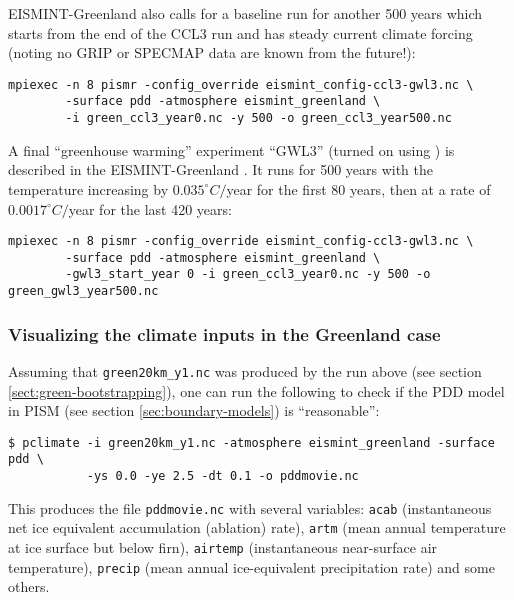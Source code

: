 EISMINT-Greenland also calls for a baseline run for another 500 years which starts from the end of the CCL3 run and has steady current climate forcing (noting no GRIP or SPECMAP data are known from the future!):

\begin{verbatim}
mpiexec -n 8 pismr -config_override eismint_config-ccl3-gwl3.nc \
        -surface pdd -atmosphere eismint_greenland \
        -i green_ccl3_year0.nc -y 500 -o green_ccl3_year500.nc
\end{verbatim}

A final ``greenhouse warming'' experiment ``GWL3'' (turned on using ) is described in the EISMINT-Greenland \cite{RitzEISMINT}.  It runs for 500 years with the temperature increasing by $0.035^\circ C/$year for the first 80 years, then at a rate of $0.0017^\circ C/$year for the last 420 years:

\begin{verbatim}
mpiexec -n 8 pismr -config_override eismint_config-ccl3-gwl3.nc \
        -surface pdd -atmosphere eismint_greenland \
        -gwl3_start_year 0 -i green_ccl3_year0.nc -y 500 -o green_gwl3_year500.nc
\end{verbatim}

\subsubsection*{Visualizing the climate inputs in the Greenland case}
\label{sec:pdd-series-with-pclimate}

Assuming that \texttt{green20km_y1.nc} was produced by the run above (see section
\ref{sect:green-bootstrapping}), one can run the following to check if the PDD
model in PISM (see section \ref{sec:boundary-models}) is ``reasonable'':
\begin{verbatim}
$ pclimate -i green20km_y1.nc -atmosphere eismint_greenland -surface pdd \
           -ys 0.0 -ye 2.5 -dt 0.1 -o pddmovie.nc 
\end{verbatim}%
This produces the file \texttt{pddmovie.nc} with several variables: \texttt{acab}
(instantaneous net ice equivalent accumulation (ablation) rate), \texttt{artm}
(mean annual temperature at ice surface but below firn), \texttt{airtemp}
(instantaneous near-surface air temperature), \texttt{precip} (mean annual
ice-equivalent precipitation rate) and some others.

